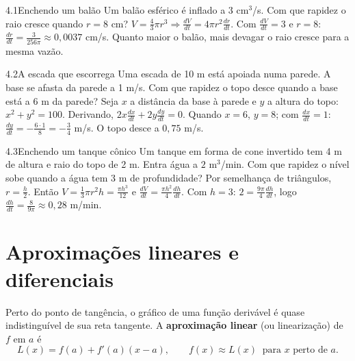 \begin{exemplo}{4.1}{Enchendo um balão}
Um balão esférico é inflado a $3$ cm$^3$/s. Com que rapidez o raio cresce quando $r=8$ cm?
\solucao
$V=\frac43\pi r^3\Rightarrow\frac{dV}{dt}=4\pi r^2\frac{dr}{dt}$. Com $\frac{dV}{dt}=3$ e
$r=8$: $\frac{dr}{dt}=\frac{3}{256\pi}\approx0{,}0037$ cm/s. Quanto maior o balão, mais devagar
o raio cresce para a mesma vazão.
\end{exemplo}

\begin{exemplo}{4.2}{A escada que escorrega}
Uma escada de 10 m está apoiada numa parede. A base se afasta da parede a 1 m/s. Com que
rapidez o topo desce quando a base está a 6 m da parede?
\solucao
{}
Seja $x$ a distância da base à parede e $y$ a altura do topo: $x^2+y^2=100$. Derivando,
$2x\frac{dx}{dt}+2y\frac{dy}{dt}=0$. Quando $x=6$, $y=8$; com $\frac{dx}{dt}=1$:
$\frac{dy}{dt}=-\frac{6\cdot1}{8}=-\frac34$ m/s. O topo desce a $0{,}75$ m/s.
\end{exemplo}

\begin{exemplo}{4.3}{Enchendo um tanque cônico}
Um tanque em forma de cone invertido tem 4 m de altura e raio do topo de 2 m. Entra água a
$2$ m$^3$/min. Com que rapidez o nível sobe quando a água tem 3 m de profundidade?
\solucao
Por semelhança de triângulos, $r=\frac h2$. Então $V=\frac13\pi r^2h=\frac{\pi h^3}{12}$ e
$\frac{dV}{dt}=\frac{\pi h^2}{4}\frac{dh}{dt}$. Com $h=3$: $2=\frac{9\pi}{4}\frac{dh}{dt}$, logo
$\frac{dh}{dt}=\frac{8}{9\pi}\approx0{,}28$ m/min.
\end{exemplo}

\section{Aproximações lineares e diferenciais}

Perto do ponto de tangência, o gráfico de uma função derivável é quase indistinguível de
sua reta tangente. A \textbf{aproximação linear} (ou linearização) de $f$ em $a$ é
\[
L(x)=f(a)+f'(a)(x-a),\qquad f(x)\approx L(x)\ \text{ para } x \text{ perto de } a .
\]

